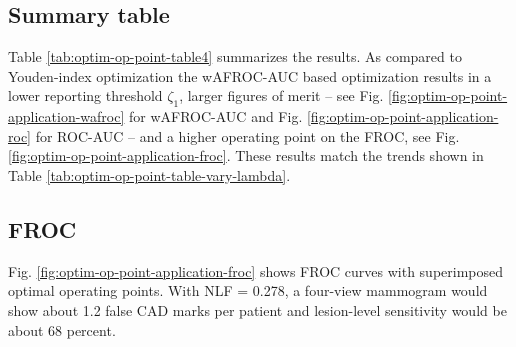 \documentclass[
]{book}
\begin{document}
\hypertarget{summary-table-1}{%
\subsection{Summary table}\label{summary-table-1}}

Table \ref{tab:optim-op-point-table4} summarizes the results. As compared to Youden-index optimization the wAFROC-AUC based optimization results in a lower reporting threshold \(\zeta_1\), larger figures of merit -- see Fig. \ref{fig:optim-op-point-application-wafroc} for wAFROC-AUC and Fig. \ref{fig:optim-op-point-application-roc} for ROC-AUC -- and a higher operating point on the FROC, see Fig. \ref{fig:optim-op-point-application-froc}. These results match the trends shown in Table \ref{tab:optim-op-point-table-vary-lambda}.

\begin{table}[H]

\caption{\label{tab:optim-op-point-table4}Summary of optimization results for example CAD FROC dataset. Table header row as in the previous table.}
\centering
{}
\end{table}

\hypertarget{froc-2}{%
\subsection{FROC}\label{froc-2}}

Fig. \ref{fig:optim-op-point-application-froc} shows FROC curves with superimposed optimal operating points. With NLF = 0.278, a four-view mammogram would show about 1.2 false CAD marks per patient and lesion-level sensitivity would be about 68 percent.
\end{document}
